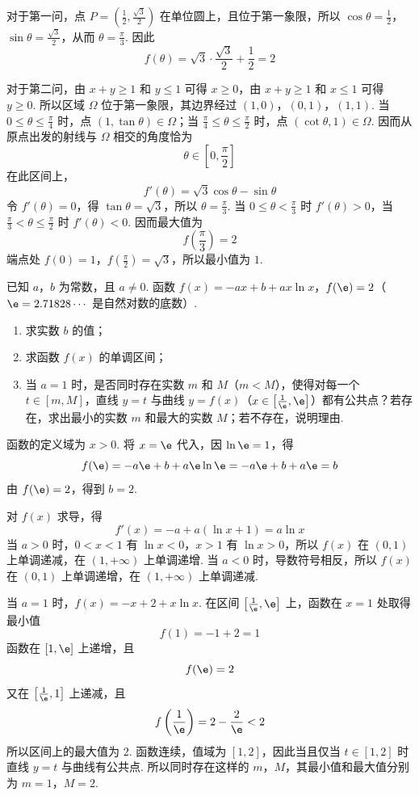 \begin{solution}
对于第一问，点 \(P=\left(\frac12,\frac{\sqrt3}{2}\right)\) 在单位圆上，且位于第一象限，所以 \(\cos\theta=\frac12\)，\(\sin\theta=\frac{\sqrt3}{2}\)，从而 \(\theta=\frac{\pi}{3}\). 因此
\[
f(\theta)=\sqrt3\cdot\frac{\sqrt3}{2}+\frac12=2
\]

对于第二问，由 \(x+y\geqslant1\) 和 \(y\leqslant1\) 可得 \(x\geqslant0\)，由 \(x+y\geqslant1\) 和 \(x\leqslant1\) 可得 \(y\geqslant0\). 所以区域 \(\Omega\) 位于第一象限，其边界经过 \((1,0)\)，\((0,1)\)，\((1,1)\). 当 \(0\leqslant\theta\leqslant\frac{\pi}{4}\) 时，点 \((1,\tan\theta)\in\Omega\)；当 \(\frac{\pi}{4}\leqslant\theta\leqslant\frac{\pi}{2}\) 时，点 \((\cot\theta,1)\in\Omega\). 因而从原点出发的射线与 \(\Omega\) 相交的角度恰为
\[
\theta\in\left[0,\frac{\pi}{2}\right]
\]
在此区间上，
\[
f'(\theta)=\sqrt3\cos\theta-\sin\theta
\]
令 \(f'(\theta)=0\)，得 \(\tan\theta=\sqrt3\)，所以 \(\theta=\frac{\pi}{3}\). 当 \(0\leqslant\theta<\frac{\pi}{3}\) 时 \(f'(\theta)>0\)，当 \(\frac{\pi}{3}<\theta\leqslant\frac{\pi}{2}\) 时 \(f'(\theta)<0\). 因而最大值为
\[
f\left(\frac{\pi}{3}\right)=2
\]
端点处 \(f(0)=1\)，\(f\left(\frac{\pi}{2}\right)=\sqrt3\)，所以最小值为 \(1\).
\end{solution}

\begin{problem}
已知 \(a\)，\(b\) 为常数，且 \(a \neq 0\). 函数 \(f(x) = -ax + b + ax \ln x\)，\(f(\e) = 2\)（\(\e = 2.71828 \cdots\) 是自然对数的底数）.

\begin{enumerate}
\item 求实数 \(b\) 的值；
\item 求函数 \( f(x) \) 的单调区间；
\item 当 \(a = 1\) 时，是否同时存在实数 \(m\) 和 \(M\)（\(m < M\)），使得对每一个 \(t \in [m, M]\)，直线 \(y = t\) 与曲线 \(y = f(x)\)（\(x \in \left[ \frac{1}{\e}, \e \right]\)）都有公共点？若存在，求出最小的实数 \(m\) 和最大的实数 \(M\)；若不存在，说明理由.
\end{enumerate}
\end{problem}

\begin{solution}
函数的定义域为 \(x>0\). 将 \(x=\e\) 代入，因 \(\ln\e=1\)，得
\[
f(\e)=-a\e+b+a\e\ln\e=-a\e+b+a\e=b
\]
由 \(f(\e)=2\)，得到 \(b=2\).

对 \(f(x)\) 求导，得
\[
f'(x)=-a+a(\ln x+1)=a\ln x
\]
当 \(a>0\) 时，\(0<x<1\) 有 \(\ln x<0\)，\(x>1\) 有 \(\ln x>0\)，所以 \(f(x)\) 在 \((0,1)\) 上单调递减，在 \((1,+\infty)\) 上单调递增. 当 \(a<0\) 时，导数符号相反，所以 \(f(x)\) 在 \((0,1)\) 上单调递增，在 \((1,+\infty)\) 上单调递减.

当 \(a=1\) 时，\(f(x)=-x+2+x\ln x\). 在区间 \(\left[\frac{1}{\e},\e\right]\) 上，函数在 \(x=1\) 处取得最小值
\[
f(1)=-1+2=1
\]
函数在 \([1,\e]\) 上递增，且
\[
f(\e)=2
\]
又在 \(\left[\frac{1}{\e},1\right]\) 上递减，且
\[
f\left(\frac{1}{\e}\right)=2-\frac{2}{\e}<2
\]
所以区间上的最大值为 \(2\). 函数连续，值域为 \([1,2]\)，因此当且仅当 \(t\in[1,2]\) 时直线 \(y=t\) 与曲线有公共点. 所以同时存在这样的 \(m\)，\(M\)，其最小值和最大值分别为 \(m=1\)，\(M=2\).
\end{solution}
